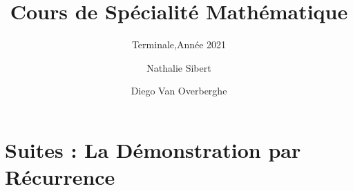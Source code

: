 \documentclass{coursbook}
\begin{document}
    \begin{titlepage}
        \title{Cours de Spécialité Mathématique}
        \subtitle{Terminale,\quad Année 2021}
        \author{Nathalie Sibert\and Diego Van Overberghe}
        \maketitle
    \end{titlepage}
    
    \tableofcontents
    
    \chapter{Suites : La Démonstration par Récurrence}
\end{document}
